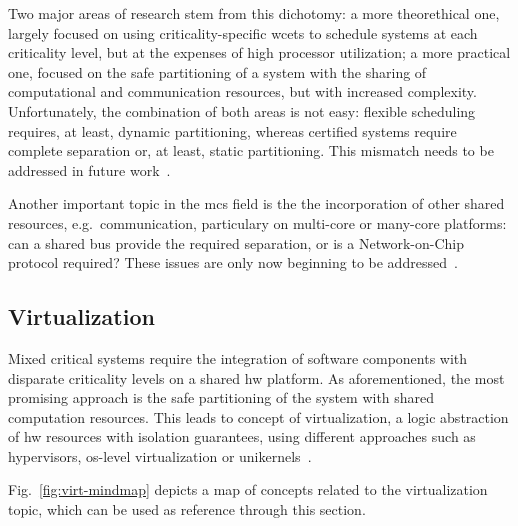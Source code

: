 Two major areas of research stem from this dichotomy: a more theorethical one,
largely focused on using criticality-specific \glspl{wcet} to schedule systems
at each criticality level, but at the expenses of high processor utilization; a
more practical one, focused on the safe partitioning of a system with the
sharing of computational and communication resources, but with increased
complexity.
Unfortunately, the combination of both areas is not easy: flexible scheduling
requires, at least, dynamic partitioning, whereas certified systems require
complete separation or, at least, static partitioning. This mismatch needs to be
addressed in future work~\cite{burns2022mixed}.

Another important topic in the \gls{mcs} field is the the incorporation of other
shared resources, e.g.~communication, particulary on multi-core or many-core
platforms: can a shared bus provide the required separation, or is a
Network-on-Chip protocol required? These issues are only now beginning to be addressed~\cite{burns2022mixed}.

\subsection{Virtualization}%
\label{sec:virtualization}
Mixed critical systems require the integration of software components with
disparate criticality levels on a shared \gls{hw} platform. As aforementioned,
the most promising approach is the safe partitioning of the system with shared
computation resources. This leads to concept of virtualization, a logic
abstraction of \gls{hw} resources with isolation guarantees, using different approaches such as
hypervisors, \gls{os}-level virtualization or unikernels~\cite{cinque2022virtualizing}.

Fig.~\ref{fig:virt-mindmap} depicts a map of concepts related to the
virtualization topic, which can be used as reference through this section.


